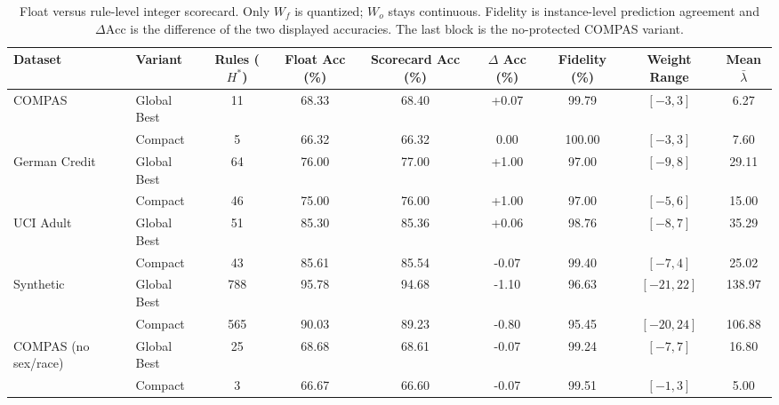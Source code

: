 \begin{table}[!tb]
\centering
\caption{Float versus rule-level integer scorecard. Only $W_f$ is quantized; $W_o$ stays continuous. Fidelity is instance-level prediction agreement and $\Delta\text{Acc}$ is the difference of the two displayed accuracies. The last block is the no-protected COMPAS variant.}
\label{tab:scorecard_fidelity}
\renewcommand{\arraystretch}{1.3}
\setlength{\tabcolsep}{3pt}
\begin{tabular}{llccccccc}
\toprule
\textbf{Dataset} & \textbf{Variant} & \textbf{Rules ($H^*$)} & \textbf{Float Acc (\%)} & \textbf{Scorecard Acc (\%)} & \textbf{$\Delta$ Acc (\%)} & \textbf{Fidelity (\%)} & \textbf{Weight Range} & \textbf{Mean $\bar{\lambda}$} \\
\midrule
\multirow{2}{*}{COMPAS} & Global Best & 11 & 68.33 & 68.40 & +0.07 & 99.79 & $[-3, 3]$ & 6.27 \\
 & Compact & 5 & 66.32 & 66.32 & 0.00 & 100.00 & $[-3, 3]$ & 7.60 \\
\midrule
\multirow{2}{*}{German Credit} & Global Best & 64 & 76.00 & 77.00 & +1.00 & 97.00 & $[-9, 8]$ & 29.11 \\
 & Compact & 46 & 75.00 & 76.00 & +1.00 & 97.00 & $[-5, 6]$ & 15.00 \\
\midrule
\multirow{2}{*}{UCI Adult} & Global Best & 51 & 85.30 & 85.36 & +0.06 & 98.76 & $[-8, 7]$ & 35.29 \\
 & Compact & 43 & 85.61 & 85.54 & -0.07 & 99.40 & $[-7, 4]$ & 25.02 \\
\midrule
\multirow{2}{*}{Synthetic} & Global Best & 788 & 95.78 & 94.68 & -1.10 & 96.63 & $[-21, 22]$ & 138.97 \\
 & Compact & 565 & 90.03 & 89.23 & -0.80 & 95.45 & $[-20, 24]$ & 106.88 \\
\midrule
\multirow{2}{*}{COMPAS (no sex/race)} & Global Best & 25 & 68.68 & 68.61 & -0.07 & 99.24 & $[-7, 7]$ & 16.80 \\
 & Compact & 3 & 66.67 & 66.60 & -0.07 & 99.51 & $[-1, 3]$ & 5.00 \\
\bottomrule
\end{tabular}
\end{table}
